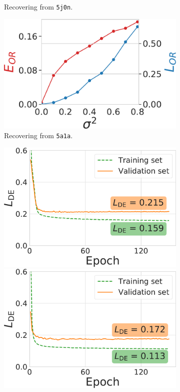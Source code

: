 \begin{figure}
\begin{minipage}[b]{0.48\linewidth}
\begin{subfigure}[b]{0.49\linewidth}
            \caption{Recovering from \texttt{5j0n}.}
        \end{subfigure}
        \hfill
        \begin{subfigure}[b]{0.49\linewidth}
        \centering
            \includegraphics[width=\linewidth]{figures/5a1a_perfect_noisy_ar_aa}
            \caption{Recovering from \texttt{5a1a}.}
        \end{subfigure}
        \caption{%
            Orientation recovery from perturbed distances.
        }\label{fig:perfect-with-noise-ar-aa}
    \end{minipage}
    \hfill
    \begin{minipage}[b]{0.45\linewidth}
        \begin{subfigure}[b]{\linewidth}
            \centering
            \includegraphics[width=0.47\linewidth]{figures/de_5j0n_fullcov_uniformS2.pdf}
            \hfill
            \includegraphics[width=0.47\linewidth]{figures/de_5a1a_last.pdf}  %

\end{subfigure}
\end{minipage}
\end{figure}
